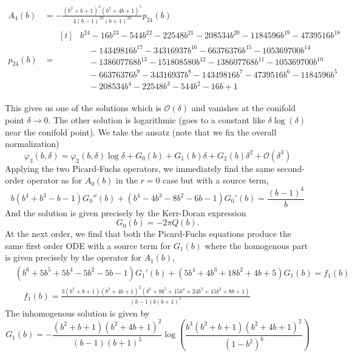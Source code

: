 \documentclass[11pt, a4paper]{article}
\numberwithin{equation}{section}
\begin{document}
\begin{equation}
  \begin{aligned}
    A_4(b) &= -\frac{\left(b^2+b+1\right)^4 \left(b^2+4 b+1\right)^5}{4 (b-1)^{19} (b+1)^{23}} p_{24}(b) \\
    p_{24}(b) &= \begin{aligned}[t]
      & b^{24}-16 b^{23}-544 b^{22}-22548 b^{21}-208534 b^{20}-1184596 b^{19}-4739516 b^{18}\\
      &\quad -14349816 b^{17}-34316937 b^{16}-66376376 b^{15}-105369700 b^{14}\\
      &\quad -138607768 b^{13}-151808580 b^{12}-138607768 b^{11}-105369700 b^{10}\\
      &\quad -66376376 b^9-34316937 b^8-14349816 b^7-4739516 b^6-1184596 b^5\\
      &\quad -208534 b^4-22548 b^3-544 b^2-16 b+1
    \end{aligned}
  \end{aligned}
\end{equation}

This gives us one of the solutions which is $\mathcal{O}(\delta)$ and vanishes at the conifold point $\delta \to 0$. The other solution is logarithmic (goes to a constant like $\delta \log(\delta)$ near the conifold point). We take the ansatz (note that we fix the overall normalization)
\begin{equation}
  \varphi_3(b, \delta) = \varphi_2(b, \delta) \log \delta + G_0(b) + G_1(b) \delta + G_2(b) \delta^2 + \mathcal{O}(\delta^3)
\end{equation}
Applying the two Picard-Fuchs operators, we immediately find the same second-order operator as for $A_0(b)$ in the $r=0$ case but with a source term,
\begin{equation}
  b \left(b^4+b^3-b-1\right) G_0''(b)+\left(b^4-4 b^3-8 b^2-6 b-1\right) G_0'(b) = \frac{(b-1)^4}{b}
\end{equation}
And the solution is given precisely by the Kerr-Doran expression
\begin{equation}
  G_0(b) = -2\pi Q(b).
\end{equation}
At the next order, we find that both the Picard-Fuchs equations produce the same first order ODE with a source term for $G_1(b)$ where the homogenous part is given precisely by the operator for $A_1(b)$,
\begin{equation}
  \begin{aligned}
    & \left(b^6+5 b^5+5 b^4-5 b^2-5 b-1\right) G_1'(b) + \left(5 b^4+4 b^3+18 b^2+4 b+5\right) G_1(b) = f_1(b) \\
    & \quad f_1(b) = \frac{3 \left(b^2+b+1\right) \left(b^2+4 b+1\right)^2 \left(b^6+8 b^5+15 b^4+24 b^3+15 b^2+8 b+1\right)}{(b-1) b (b+1)^5}
  \end{aligned}
\end{equation}
The inhomogenous solution is given by
\begin{equation}
  G_1(b) = -\frac{\left(b^2+b+1\right) \left(b^2+4 b+1\right)^2}{(b-1) (b+1)^5} \log \left(\frac{b^3 \left(b^2+b+1\right) \left(b^2+4 b+1\right)^2}{\left(1-b^2\right)^6}\right)
\end{equation}
\end{document}
